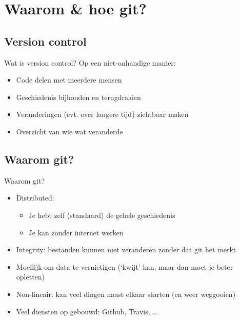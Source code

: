 \section[W\&H?]{Waarom \& hoe git?}

\subsection{Version control}
\begin{frame}{Wat is version control?}
	Op een niet-onhandige manier:
		\begin{itemize}
			\item Code delen met meerdere mensen
			\item Geschiedenis bijhouden en terugdraaien
			\item Veranderingen (evt. over langere tijd) zichtbaar maken
			\item Overzicht van wie wat veranderde
		\end{itemize}
\end{frame}

\subsection{Waarom git?}
\begin{frame}{Waarom git?}
	\begin{itemize}
		\item Distributed:
			\begin{itemize}
				\item Je hebt zelf (standaard) de gehele geschiedenis
				\item Je kan zonder internet werken
			\end{itemize}
		\item Integrity: bestanden kunnen niet veranderen zonder dat git het merkt
		\item Moeilijk om data te vernietigen (`kwijt' kan, maar dan moet je beter opletten)
		\item Non-lineair: kan veel dingen naast elkaar starten (en weer weggooien)
		\item Veel diensten op gebouwd: Github, Travis, \ldots
	\end{itemize}
\end{frame}

